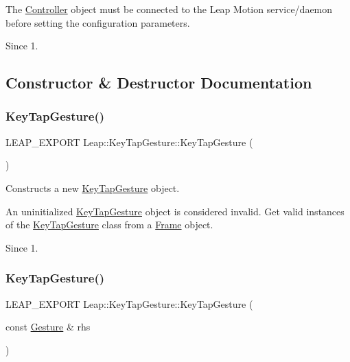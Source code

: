 The \hyperlink{class_leap_1_1_controller}{Controller} object must be connected to the Leap Motion service/daemon before setting the configuration parameters.

\begin{DoxySince}{Since}
1. 
\end{DoxySince}


\subsection{Constructor \& Destructor Documentation}
\mbox{\label{class_leap_1_1_key_tap_gesture_a916eb2060586a29c499b0201cef9b203}} 
\subsubsection{\texorpdfstring{Key\+Tap\+Gesture()}{KeyTapGesture()}\hspace{0.1cm}{\footnotesize\ttfamily [1/2]}}
{\footnotesize\ttfamily L\+E\+A\+P\+\_\+\+E\+X\+P\+O\+RT Leap\+::\+Key\+Tap\+Gesture\+::\+Key\+Tap\+Gesture (\begin{DoxyParamCaption}{ }\end{DoxyParamCaption})}

Constructs a new \hyperlink{class_leap_1_1_key_tap_gesture}{Key\+Tap\+Gesture} object.

An uninitialized \hyperlink{class_leap_1_1_key_tap_gesture}{Key\+Tap\+Gesture} object is considered invalid. Get valid instances of the \hyperlink{class_leap_1_1_key_tap_gesture}{Key\+Tap\+Gesture} class from a \hyperlink{class_leap_1_1_frame}{Frame} object. \begin{DoxySince}{Since}
1. 
\end{DoxySince}
\mbox{\label{class_leap_1_1_key_tap_gesture_a701172268caa05b6c05bf3cd8578bde5}} 
\subsubsection{\texorpdfstring{Key\+Tap\+Gesture()}{KeyTapGesture()}\hspace{0.1cm}{\footnotesize\ttfamily [2/2]}}
{\footnotesize\ttfamily L\+E\+A\+P\+\_\+\+E\+X\+P\+O\+RT Leap\+::\+Key\+Tap\+Gesture\+::\+Key\+Tap\+Gesture (\begin{DoxyParamCaption}\item[{const \hyperlink{class_leap_1_1_gesture}{Gesture} \&}]{rhs }\end{DoxyParamCaption})}

